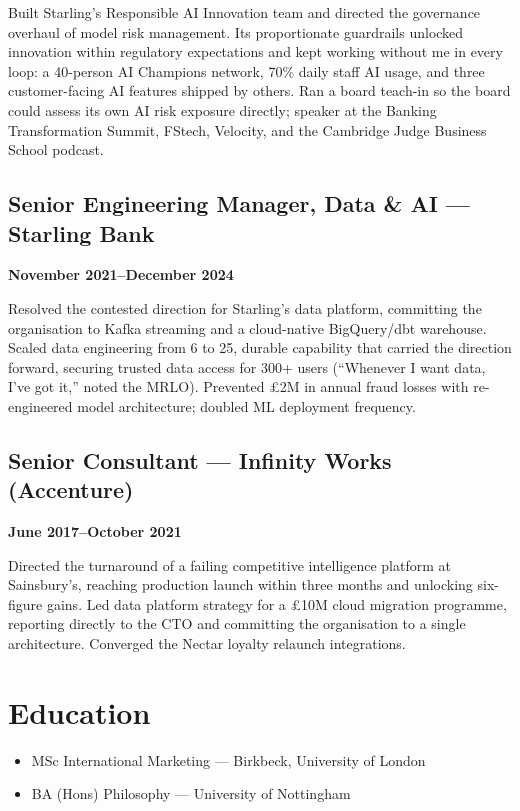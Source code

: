 \documentclass[a4paper]{scrartcl}
\begin{document}
Built Starling's Responsible AI Innovation team and directed the governance overhaul of model risk
management. Its proportionate guardrails unlocked innovation within regulatory expectations and kept
working without me in every loop: a 40-person AI Champions network, 70\% daily staff AI usage, and three
customer-facing AI features shipped by others. Ran a board teach-in so the board could assess its own AI
risk exposure directly; speaker at the Banking Transformation Summit, FStech, Velocity, and the Cambridge
Judge Business School podcast.

\subsection*{Senior Engineering Manager, Data \& AI --- Starling Bank}
\textbf{November 2021--December 2024}

Resolved the contested direction for Starling's data platform, committing the organisation to Kafka
streaming and a cloud-native BigQuery/dbt warehouse. Scaled data engineering from 6 to 25, durable
capability that carried the direction forward, securing trusted data access for 300+ users (``Whenever
I want data, I've got it,'' noted the MRLO). Prevented £2M in annual fraud losses with re-engineered
model architecture; doubled ML deployment frequency.

\subsection*{Senior Consultant --- Infinity Works (Accenture)}
\textbf{June 2017--October 2021}

Directed the turnaround of a failing competitive intelligence platform at Sainsbury's, reaching
production launch within three months and unlocking six-figure gains. Led data platform strategy for a £10M cloud migration
programme, reporting directly to the CTO and committing the organisation to a single architecture.
Converged the Nectar loyalty relaunch integrations.

\section*{Education}
\begin{itemize}
  \item MSc International Marketing --- Birkbeck, University of London
  \item BA (Hons) Philosophy --- University of Nottingham
\end{itemize}
\end{document}
